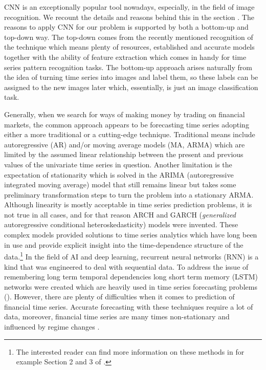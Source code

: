 \documentclass[11pt, a4paper]{article}
\begin{document}
CNN is an exceptionally popular tool nowadays, especially, in the field of image recognition. We recount the details and reasons behind this in the section .
The reasons to apply CNN for our problem is supported by both a bottom-up and top-down way. The top-down comes from the recently mentioned recognition of the technique which 
means plenty of resources, established and accurate models together with the ability of feature extraction which comes in handy for time series pattern recognition tasks. 
The bottom-up approach arises naturally from the idea of turning time series into images and label them, so these labels can be assigned to the new images later which, essentially, is 
just an image classification task. 

Generally, when we search for ways of making money by trading on financial markets, the common approach appears to be forecasting time series adopting either a more traditional or a cutting-edge technique. 
Traditional means include autoregressive (AR) and/or moving average models (MA, ARMA) which are limited by the assumed linear relationship between the present and previous values of the univariate time series in question. 
Another limitation is the expectation of stationarity which is solved in the ARIMA (autoregressive integrated moving average) model that still remains linear but takes some preliminary transformation steps 
to turn the problem into a stationary ARMA. Although linearity is mostly acceptable in time series prediction problems, it is not true in all cases, and for that reason  
ARCH and GARCH (\textit{generalized} autoregressive conditional heteroskedasticity) models were invented. These complex models provided solutions to time series analytics which have long been in use and provide explicit insight into the time-dependence structure of the data.\footnote{The interested reader can find more information on these methods in for example Section 2 and 3 of \cite{tsay2005analysis}.}
In the field of AI and deep learning, recurrent neural networks (RNN) is a kind that was engineered to deal with sequential data. To address the issue of remembering long term temporal dependencies long 
short term memory (LSTM) networks were created which are heavily used in time series forecasting problems (\cite{Hochr97LSTM}). 
However, there are plenty of difficulties when it comes to prediction of financial time series. Accurate forecasting with these techniques require a lot of data, moreover, financial time series are many times non-stationary and influenced by regime changes \cite{lemus_2018}.
\end{document}
